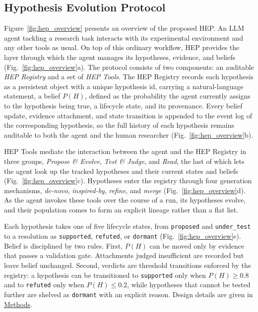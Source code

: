 \subsection{Hypothesis Evolution Protocol}
Figure~\ref{fig:hep_overview} presents an overview of the proposed
HEP.
An LLM agent tackling a research task interacts with its experimental
environment and any other tools as usual.
On top of this ordinary
workflow, HEP provides the layer through which the agent manages its
hypotheses, evidence, and beliefs (Fig.~\ref{fig:hep_overview}a).
The protocol consists of two components: an auditable
\emph{HEP Registry} and a set of \emph{HEP Tools}.
The HEP Registry records each hypothesis as a persistent object with a
unique hypothesis id, carrying a natural-language statement, a belief
$P(H)$, defined as the probability the agent currently assigns to the
hypothesis being true, a lifecycle state, and its provenance.
Every belief update, evidence attachment, and state transition is
appended to the event log of the corresponding hypothesis, so the full
history of each hypothesis remains auditable to both the agent and the
human researcher (Fig.~\ref{fig:hep_overview}b).

HEP Tools mediate the interaction between the agent and the HEP
Registry in three groups, \emph{Propose \& Evolve}, \emph{Test \&
Judge}, and \emph{Read}, the last of which lets the agent look up the
tracked hypotheses and their current states and beliefs
(Fig.~\ref{fig:hep_overview}c).
Hypotheses enter the registry through four generation mechanisms,
\emph{de-novo}, \emph{inspired-by}, \emph{refine}, and \emph{merge}
(Fig.~\ref{fig:hep_overview}d).
As the agent invokes these tools over
the course of a run, its hypotheses evolve, and their population comes
to form an explicit lineage rather than a flat list.

Each hypothesis takes one of five lifecycle states, from
\texttt{proposed} and \texttt{under\_test} to a resolution as
\texttt{supported}, \texttt{refuted}, or \texttt{dormant}
(Fig.~\ref{fig:hep_overview}e).
Belief is disciplined by two rules.
First, $P(H)$ can be moved only by evidence that passes a validation
gate.
Attachments judged insufficient are recorded but leave belief
unchanged.
Second, verdicts are threshold transitions enforced by the registry:
a hypothesis can be transitioned to \texttt{supported} only when
$P(H)\ge 0.8$ and to \texttt{refuted} only when $P(H)\le 0.2$, while
hypotheses that cannot be tested further are shelved as
\texttt{dormant} with an explicit reason.
Design details are given in \hyperref[sec:methods]{Methods}.



